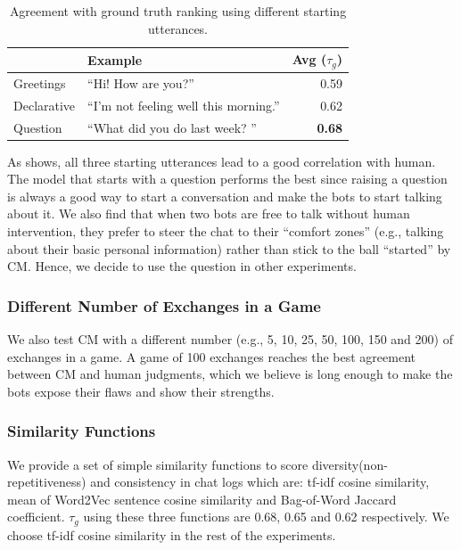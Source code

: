 \begin{table}[th!]
\centering
\scriptsize
\begin{tabular}{llr}
\toprule
 & Example  & Avg ($\tau_{g}$)\\ \midrule
Greetings  & ``Hi! How are you?'' & 0.59  \\
Declarative  & ``I'm not feeling well this morning.'' & 0.62  \\
Question  & ``What did you do last week? '' & \textbf{0.68}  \\
\bottomrule
\end{tabular}
\caption{
Agreement with ground truth ranking using different starting utterances.} 
\label{tab:multi-context}
\end{table}

As  shows,
 all three starting utterances lead to a 
good correlation with human. 
The model that starts with a question performs the best since 
raising a question is always a good way to start a conversation 
and make the bots to start talking about it.
We also find that when two 
bots are free to talk without human intervention, they prefer 
to steer the chat to their ``comfort zones'' (e.g., talking about 
their basic personal information) rather than stick to the ball 
``started'' by CM. 
Hence, we decide to use the question in other experiments.

\subsubsection{Different Number of Exchanges in a Game} 

We also test CM with a different number (e.g., 5, 10, 25, 50, 100, 150 and 200) of exchanges in a game.
A game of 100 exchanges reaches the best agreement between 
CM and human judgments, which we believe is long enough to make the bots
 expose their flaws
and show their strengths.


\subsubsection{Similarity Functions} 
 We provide a set of simple similarity functions 
to score diversity(non-repetitiveness) and consistency in chat logs which are: 
tf-idf cosine similarity, mean of Word2Vec sentence cosine similarity 
and Bag-of-Word Jaccard coefficient. $\tau_{g}$ using these three functions are 0.68, 0.65 and 0.62 respectively. We choose tf-idf cosine similarity in
the rest of the experiments.

